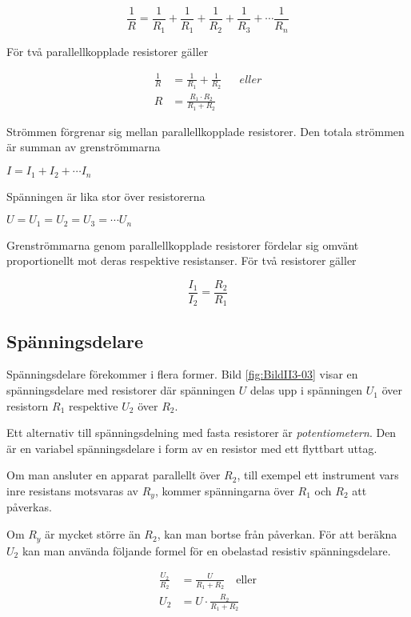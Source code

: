 \[
\frac{1}{R} = \frac{1}{R_1} + \frac{1}{R_1} +
\frac{1}{R_2} + \frac{1}{R_3} + \cdots \frac{1}{R_n}
\]

För två parallellkopplade resistorer gäller

\begin{align*}
\frac{1}{R} &= \frac{1}{R_1} + \frac{1}{R_2} && eller \\
R &= \frac{R_1 \cdot R_2}{R_1 + R_2}
\end{align*}

Strömmen förgrenar sig mellan parallellkopplade resistorer.
Den totala strömmen är summan av grenströmmarna

\( I = I_1 + I_2 + \cdots I_n \)

Spänningen är lika stor över resistorerna

\(U = U_1 = U_2 = U_3 = \cdots U_n \)

Grenströmmarna genom parallellkopplade resistorer fördelar sig omvänt
proportionellt mot deras respektive resistanser.
För två resistorer gäller

\[\frac{I_1}{I_2} = \frac{R_2}{R_1}\]

\subsection{Spänningsdelare}
\label{spänningsdelare}


Spänningsdelare förekommer i flera former.
Bild \ref{fig:BildII3-03} visar en spänningsdelare med resistorer där
spänningen \(U\) delas upp i spänningen \(U_1\) över resistorn \(R_1\)
respektive \(U_2\) över \(R_2\).

Ett alternativ till spänningsdelning med fasta resistorer är \emph{potentiometern}. 
Den är en variabel spänningsdelare i form av en resistor med ett flyttbart uttag.

Om man ansluter en apparat parallellt över \(R_2\), till exempel ett instrument
vars inre resistans motsvaras av \(R_y\), kommer spänningarna över \(R_1\)
och \(R_2\) att påverkas.

Om \(R_y\) är mycket större än \(R_2\), kan man bortse från påverkan.
För att beräkna \(U_2\) kan man använda följande formel för en obelastad
resistiv spänningsdelare.

\begin{align*}
\frac{U_2}{R_2} &= \frac{U}{R_1 + R_2} \quad \text{eller} \\
U_2 &= U \cdot \frac{R_2}{R_1 + R_2}
\end{align*}

